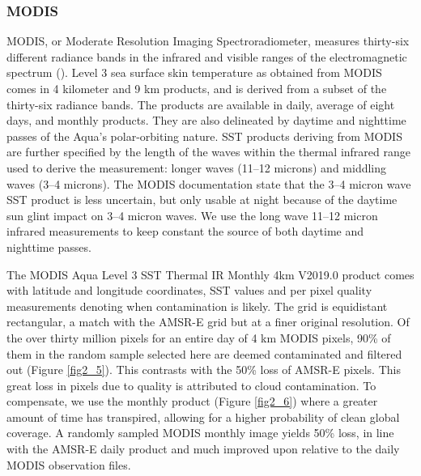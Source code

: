 \begin{refsection}
\subsubsection{MODIS}
MODIS, or Moderate Resolution Imaging Spectroradiometer, measures thirty-six different radiance bands in the infrared and visible ranges of the electromagnetic spectrum (\cite{esaias1998overview}). Level 3 sea surface skin temperature as obtained from MODIS comes in 4 kilometer and 9 km products, and is derived from a subset of the thirty-six radiance bands. The products are available in daily, average of eight days, and monthly products. They are also delineated by daytime and nighttime passes of the Aqua’s polar-orbiting nature. SST products deriving from MODIS are further specified by the length of the waves within the thermal infrared range used to derive the measurement: longer waves (11–12 microns) and middling waves (3–4 microns). The MODIS documentation state that the 3–4 micron wave SST product is less uncertain, but only usable at night because of the daytime sun glint impact on 3–4 micron waves. We use the long wave 11–12 micron infrared measurements to keep constant the source of both daytime and nighttime passes.

The MODIS Aqua Level 3 SST Thermal IR Monthly 4km V2019.0 product comes with latitude and longitude coordinates, SST values and per pixel quality measurements denoting when contamination is likely. The grid is equidistant rectangular, a match with the AMSR-E grid but at a finer original resolution. Of the over thirty million pixels for an entire day of 4 km MODIS pixels, 90\% of them in the random sample selected here are deemed contaminated and filtered out (Figure \ref{fig2_5}). This contrasts with the 50\% loss of AMSR-E pixels. This great loss in pixels due to quality is attributed to cloud contamination. To compensate, we use the monthly product (Figure \ref{fig2_6}) where a greater amount of time has transpired, allowing for a higher probability of clean global coverage. A randomly sampled MODIS monthly image yields 50\% loss, in line with the AMSR-E daily product and much improved upon relative to the daily MODIS observation files.


\end{refsection}
